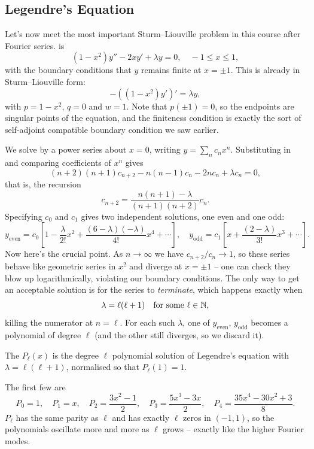 \documentclass[a4paper]{scrartcl}
\begin{document}
\subsection{Legendre's Equation}

Let's now meet the most important Sturm--Liouville problem in this course after Fourier series.  is
$$
(1 - x^2) y'' - 2x y' + \lambda y = 0, \quad -1 \leq x \leq 1,
$$
with the boundary conditions that $y$ remains finite at $x = \pm 1$.
This is already in Sturm--Liouville form:
$$
-\left((1 - x^2) y'\right)' = \lambda y,
$$
with $p = 1 - x^2$, $q = 0$ and $w = 1$. Note that $p(\pm 1) = 0$, so the endpoints are singular points of the equation, and the finiteness condition is exactly the sort of self-adjoint compatible boundary condition we saw earlier.

We solve by a power series about $x = 0$, writing $y = \sum_n c_n x^n$. Substituting in and comparing coefficients of $x^n$ gives
$$
(n+2)(n+1) c_{n + 2} - n(n-1) c_n - 2n c_n + \lambda c_n = 0,
$$
that is, the recursion
$$
c_{n + 2} = \frac{n(n + 1) - \lambda}{(n + 1)(n + 2)} c_n.
$$
Specifying $c_0$ and $c_1$ gives two independent solutions, one even and one odd:
$$
y_{\text{even}} = c_0 \left[1 - \frac{\lambda}{2!} x^2 + \frac{(6 - \lambda)(-\lambda)}{4!}x^4 + \cdots \right], \quad
y_{\text{odd}} = c_1 \left[x + \frac{(2 - \lambda)}{3!}x^3 + \cdots\right].
$$
Now here's the crucial point. As $n \rightarrow \infty$ we have $c_{n+2}/c_n \rightarrow 1$, so these series behave like geometric series in $x^2$ and diverge at $x = \pm 1$ -- one can check they blow up logarithmically, violating our boundary conditions. The only way to get an acceptable solution is for the series to \emph{terminate}, which happens exactly when
$$
\lambda = \ell (\ell + 1) \quad \text{for some } \ell \in \mathbb{N},
$$
killing the numerator at $n = \ell$. For each such $\lambda$, one of $y_{\text{even}}$, $y_{\text{odd}}$ becomes a polynomial of degree $\ell$ (and the other still diverges, so we discard it).

\begin{definition}
    The  $P_\ell(x)$ is the degree $\ell$ polynomial solution of Legendre's equation with $\lambda = \ell(\ell + 1)$, normalised so that $P_\ell(1) = 1$.
\end{definition}

The first few are
$$
P_0 = 1, \quad P_1 = x, \quad P_2 = \frac{3x^2 - 1}{2}, \quad P_3 = \frac{5x^3 - 3x}{2}, \quad P_4 = \frac{35 x^4 - 30 x^2 + 3}{8}.
$$
$P_\ell$ has the same parity as $\ell$ and has exactly $\ell$ zeros in $(-1, 1)$, so the polynomials oscillate more and more as $\ell$ grows -- exactly like the higher Fourier modes.
\end{document}
